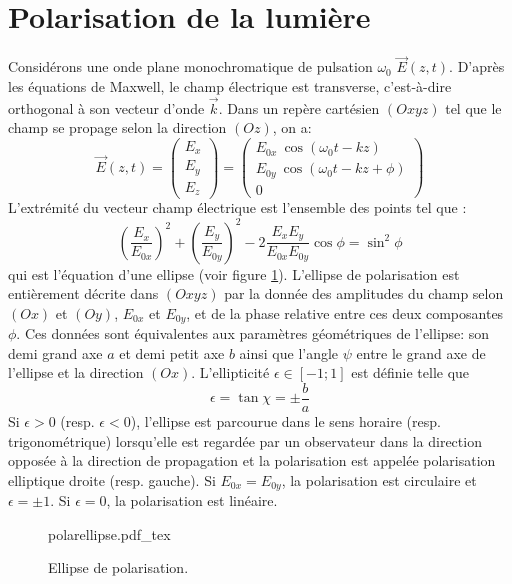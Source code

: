 \section{Polarisation de la lumière}
Considérons une onde plane monochromatique de pulsation $\omega_0$ $\vec{E}(z,t)$. D'après les équations de Maxwell, le champ électrique est transverse, c'est-à-dire orthogonal à son vecteur d'onde $\vec{k}$. Dans un repère cartésien $(Oxyz)$ tel que le champ se propage selon la direction $(Oz)$, on a:
\begin{equation}
\vec{E}(z,t) = \begin{pmatrix}
E_x \\
E_y\\
E_z
\end{pmatrix} =
\begin{pmatrix}
E_{0x} \: \cos(\omega_0 t - k z) \\
E_{0y} \: \cos(\omega_0 t - k z + \phi)  \\
0
\end{pmatrix}
\end{equation}
L'extrémité du vecteur champ électrique est l'ensemble des points tel que : 
\begin{equation}
\left(\frac{E_x}{E_{0x}}\right)^2 + \left(\frac{E_y}{E_{0y}}\right)^2 - 2 \frac{E_x E_y}{E_{0x} E_{0y}} \cos \phi = \sin^2 \phi
\end{equation}
qui est l'équation d'une ellipse (voir figure \ref{fig:Polarellipse}). L'ellipse de polarisation est entièrement décrite dans $(Oxyz)$ par la donnée des amplitudes du champ selon $(Ox)$ et $(Oy)$, $E_{0x}$ et $E_{0y}$, et de la phase relative entre ces deux composantes $\phi$. Ces données sont équivalentes aux paramètres géométriques de l'ellipse: son demi grand axe $a$ et demi petit axe $b$ ainsi que l'angle $\psi$ entre le grand axe de l'ellipse et la direction $(Ox)$. L'ellipticité $\epsilon \in [-1; 1]$ est définie telle que 
\begin{equation}
\epsilon = \tan \chi = \pm \frac{b}{a}
\end{equation}
Si $\epsilon > 0$ (resp. $\epsilon <0$), l'ellipse est parcourue dans le sens horaire (resp. trigonométrique) lorsqu'elle est regardée par un observateur dans la direction opposée à la direction de propagation et la polarisation est appelée polarisation elliptique droite (resp. gauche). Si $E_{0x} = E_{0y}$, la polarisation est circulaire et $\epsilon = \pm 1$. Si $\epsilon = 0$, la polarisation est linéaire.

\begin{figure}
\centering
\def\svgwidth{0.7\textwidth}
{polarellipse.pdf_tex}
\caption{Ellipse de polarisation.}
\label{fig:Polarellipse}
\end{figure}

